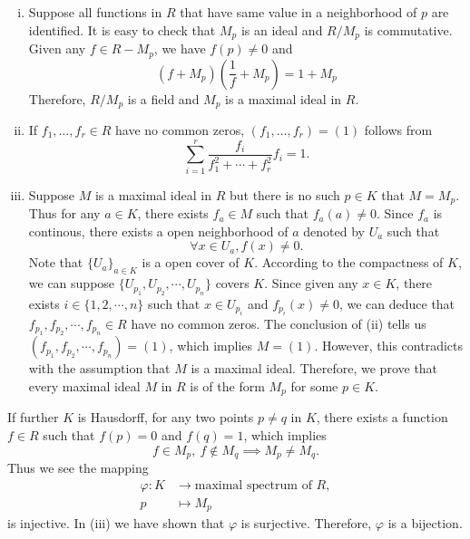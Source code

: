 \documentclass[12pt,letterpaper,boxed]{hmcpset}
\begin{document}
\begin{solution}
	\begin{enumerate}[(i)]
		\item Suppose all functions in $R$ that have same value in a neighborhood of $p$ are identified. It is easy to check that $M_p$ is an ideal and $R/M_p$ is commutative. Given any $f\in R-M_p$, we have $f(p)\ne0$ and
		\[
		(f+M_p)\left(\frac{1}{f}+M_p\right)=1+M_p
		\]
		Therefore, $R/M_p$ is a field and  $M_{p}$ is a maximal ideal in $R$.
		\item If $f_{1}, \ldots, f_{r} \in R$ have no common zeros, $\left(f_{1}, \ldots, f_{r}\right)=(1)$ follows from
		\[
		\sum_{i=1}^r\frac{f_i}{f_1^2+\cdots+f_r^2}f_i=1.
		\]
		\item Suppose $M$ is a maximal ideal in $R$ but there is no such $p\in K$ that $M=M_p$. Thus for any $a\in K$, there exists $f_a\in M$ such that $f_a(a)\ne0$. Since $f_a$ is continous, there exists a open neighborhood of $a$ denoted by $U_a$ such that 
		\[
		\forall x\in U_a, f(x)\ne0.
		\]
		Note that $\{U_a\}_{a\in K}$ is a open cover of $K$. According to the compactness of $K$, we can suppose $\{U_{p_1},U_{p_2},\cdots,U_{p_n}\}$ covers $K$. Since given any $x\in K$, there exists $i\in\{1,2,\cdots,n\}$ such that $x\in U_{p_i}$ and $f_{p_i}(x)\ne 0$, we can deduce that $f_{p_1},f_{p_2}, \cdots, f_{p_n} \in R$ have no common zeros. The conclusion of (ii) tells us $\left(f_{p_1},f_{p_2}, \cdots, f_{p_n}\right)=(1)$, which implies $M=(1)$. However, this contradicts with the assumption that $M$ is a maximal ideal. Therefore, we prove that every maximal ideal $M$ in $R$ is of the form $M_{p}$ for some $p \in K$.
	\end{enumerate}
If further $K$ is Hausdorff, for any two points $p \neq q$ in $K$, there exists a function $f \in R$ such that $f(p)=0$ and $f(q)=1$, which implies
\[
f\in M_p, \ f\notin M_q\implies M_p\ne M_q.
\] 
Thus we see the mapping 
\begin{align*}
	\varphi:K& \longrightarrow \text{maximal spectrum of } R,\\
	p& \longmapsto M_{p}
\end{align*}
 is injective. In (iii) we have shown that $\varphi$ is surjective. Therefore, $\varphi$ is a bijection.
\end{solution}
\end{document}
